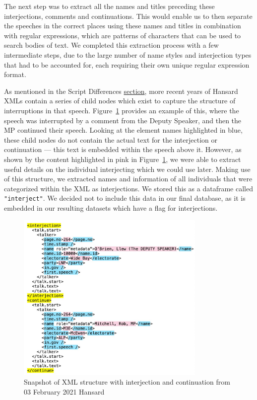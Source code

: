 \documentclass[
  letterpaper,
  DIV=11,
  numbers=noendperiod]{scrartcl}
\begin{document}
The next step was to extract all the names and titles preceding these
interjections, comments and continuations. This would enable us to then
separate the speeches in the correct places using these names and titles
in combination with regular expressions, which are patterns of
characters that can be used to search bodies of text. We completed this
extraction process with a few intermediate steps, due to the large
number of name styles and interjection types that had to be accounted
for, each requiring their own unique regular expression format.

As mentioned in the Script Differences
\protect\hyperlink{sec-diff}{section}, more recent years of Hansard XMLs
contain a series of child nodes which exist to capture the structure of
interruptions in that speech. Figure~\ref{fig-xml2} provides an example
of this, where the speech was interrupted by a comment from the Deputy
Speaker, and then the MP continued their speech. Looking at the element
names highlighted in blue, these child nodes do not contain the actual
text for the interjection or continuation --- this text is embedded
within the speech above it. However, as shown by the content highlighted
in pink in Figure~\ref{fig-xml2}, we were able to extract useful details
on the individual interjecting which we could use later. Making use of
this structure, we extracted names and information of all individuals
that were categorized within the XML as interjections. We stored this as
a dataframe called \texttt{"interject"}. We decided not to include this
data in our final database, as it is embedded in our resulting datasets
which have a flag for interjections.

\begin{figure}

{\centering \includegraphics[width=3.59375in,height=\textheight]{xml2.jpg}

}

\caption{\label{fig-xml2}Snapshot of XML structure with interjection and
continuation from 03 February 2021 Hansard}

\end{figure}
\end{document}
